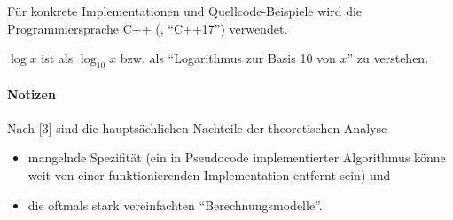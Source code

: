 Für konkrete Implementationen und Quellcode-Beispiele wird die Programmiersprache C++ (\cite{ISO-C++17}, \enquote{C++17}) verwendet.

$\log x$ ist als $\log_{10} x$ bzw. als \enquote{Logarithmus zur Basis 10 von $x$} zu verstehen. 

\paragraph{Notizen}

Nach \cite{mcg2012}[3] sind die hauptsächlichen Nachteile der theoretischen Analyse
\begin{itemize}
    \item mangelnde Spezifität (ein in Pseudocode implementierter Algorithmus könne weit von einer funktionierenden Implementation entfernt sein) und
    \item die oftmals stark vereinfachten \enquote{Berechnungsmodelle}.
\end{itemize}


